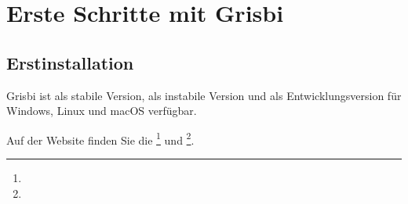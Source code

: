 

\chapter{Erste Schritte mit Grisbi\label{start}}

\section{Erstinstallation\label{start-install}}

Grisbi ist als stabile Version, als instabile Version und als Entwicklungsversion für Windows, Linux und macOS verfügbar.

\noindent
Auf der Website  finden Sie die \footnote{\urlSourceForgeGrisbiStable} und \footnote{\urlSourceForgeGrisbiInstable}.

